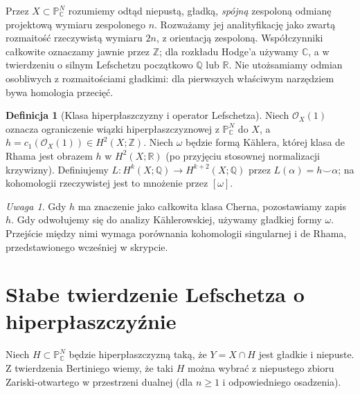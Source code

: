 \documentclass[11pt,a4paper,oneside]{report}
\newcommand{\R}{\mathbb{R}}
\newcommand{\C}{\mathbb{C}}
\newcommand{\Z}{\mathbb{Z}}
\newcommand{\Q}{\mathbb{Q}}
\theoremstyle{plain}
\theoremstyle{definition}
\newtheorem{definicja}[twierdzenie]{Definicja}
\theoremstyle{remark}
\newtheorem{uwaga}[twierdzenie]{Uwaga}
\begin{document}
Przez $X\subset\mathbb P^N_\C$ rozumiemy odtąd niepustą,
gładką, \emph{spójną} zespoloną odmianę projektową wymiaru zespolonego
$n$. Rozważamy jej analityfikację jako zwartą rozmaitość
rzeczywistą wymiaru $2n$, z orientacją zespoloną. Współczynniki
całkowite oznaczamy jawnie przez $\Z$; dla rozkładu Hodge'a używamy
$\C$, a w twierdzeniu o silnym Lefschetzu początkowo $\Q$ lub $\R$.
Nie utożsamiamy odmian osobliwych z rozmaitościami gładkimi: dla
pierwszych właściwym narzędziem bywa homologia przecięć.

\begin{definicja}[Klasa hiperpłaszczyzny i operator Lefschetza]
Niech $\mathcal O_X(1)$ oznacza ograniczenie wiązki hiperpłaszczyznowej
z $\mathbb P^N_\C$ do $X$, a $h=c_1(\mathcal O_X(1))\in
H^2(X;\Z)$. Niech $\omega$ będzie formą Kählera, której klasa
de Rhama jest obrazem $h$ w $H^2(X;\R)$ (po przyjęciu stosownej
normalizacji krzywizny). Definiujemy
$L:H^k(X;\Q)\to H^{k+2}(X;\Q)$ przez $L(\alpha)=h\smile\alpha$;
na kohomologii rzeczywistej jest to mnożenie przez $[\omega]$.
\end{definicja}
\begin{uwaga}
Gdy $h$ ma znaczenie jako całkowita klasa Cherna, pozostawiamy
zapis $h$. Gdy odwołujemy się do analizy Kählerowskiej,
używamy gładkiej formy $\omega$. Przejście między nimi wymaga
porównania kohomologii singularnej i de Rhama, przedstawionego
wcześniej w skrypcie.
\end{uwaga}

\section{Słabe twierdzenie Lefschetza o hiperpłaszczyźnie}
Niech $H\subset\mathbb P^N_\C$ będzie hiperpłaszczyzną taką,
że $Y=X\cap H$ jest gładkie i niepuste. Z twierdzenia Bertiniego
wiemy, że taki $H$ można wybrać z niepustego zbioru Zariski-otwartego
w przestrzeni dualnej (dla $n\ge1$ i odpowiedniego osadzenia).
\end{document}

